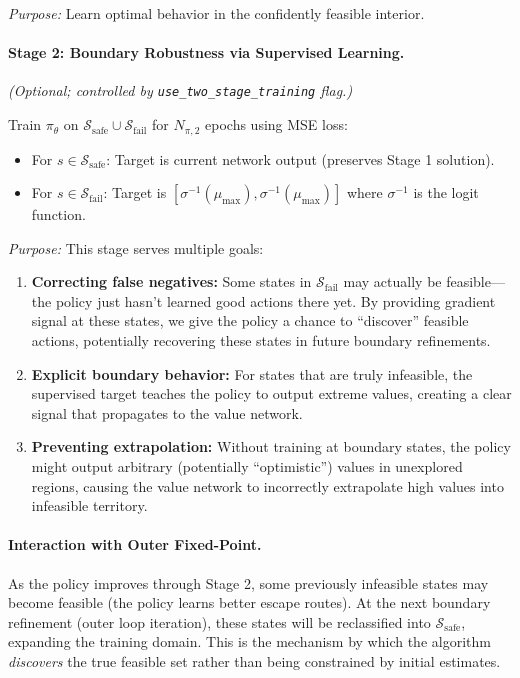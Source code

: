 \textit{Purpose:} Learn optimal behavior in the confidently feasible interior.

\paragraph{Stage 2: Boundary Robustness via Supervised Learning.}
\textit{(Optional; controlled by \texttt{use\_two\_stage\_training} flag.)}

Train $\pi_\theta$ on $\mathcal{S}_{\text{safe}} \cup \mathcal{S}_{\text{fail}}$ for $N_{\pi,2}$ epochs using MSE loss:
\begin{itemize}
    \item For $s \in \mathcal{S}_{\text{safe}}$: Target is current network output (preserves Stage 1 solution).
    \item For $s \in \mathcal{S}_{\text{fail}}$: Target is $[\sigma^{-1}(\mu_{\max}), \sigma^{-1}(\mu_{\max})]$ where $\sigma^{-1}$ is the logit function.
\end{itemize}

\textit{Purpose:} This stage serves multiple goals:
\begin{enumerate}
    \item \textbf{Correcting false negatives:} Some states in $\mathcal{S}_{\text{fail}}$ may actually be feasible---the policy just hasn't learned good actions there yet. By providing gradient signal at these states, we give the policy a chance to ``discover'' feasible actions, potentially recovering these states in future boundary refinements.
    \item \textbf{Explicit boundary behavior:} For states that are truly infeasible, the supervised target teaches the policy to output extreme values, creating a clear signal that propagates to the value network.
    \item \textbf{Preventing extrapolation:} Without training at boundary states, the policy might output arbitrary (potentially ``optimistic'') values in unexplored regions, causing the value network to incorrectly extrapolate high values into infeasible territory.
\end{enumerate}

\paragraph{Interaction with Outer Fixed-Point.}
As the policy improves through Stage 2, some previously infeasible states may become feasible (the policy learns better escape routes). At the next boundary refinement (outer loop iteration), these states will be reclassified into $\mathcal{S}_{\text{safe}}$, expanding the training domain. This is the mechanism by which the algorithm \textit{discovers} the true feasible set rather than being constrained by initial estimates.


